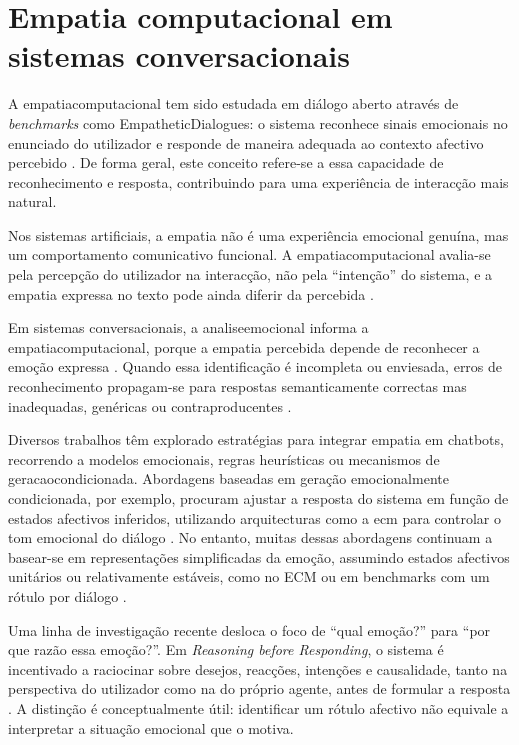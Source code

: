 \section{Empatia computacional em sistemas conversacionais}
\label{sec:empatia}

A \gls{empatiacomputacional} tem sido estudada em diálogo aberto através de \textit{benchmarks} como EmpatheticDialogues: o sistema reconhece sinais emocionais no enunciado do utilizador e responde de maneira adequada ao contexto afectivo percebido \parencite{Rashkin2019Empathy}. De forma geral, este conceito refere-se a essa capacidade de reconhecimento e resposta, contribuindo para uma experiência de interacção mais natural.

Nos sistemas artificiais, a empatia não é uma experiência emocional genuína, mas um comportamento comunicativo funcional. A \gls{empatiacomputacional} avalia-se pela percepção do utilizador na interacção, não pela ``intenção'' do sistema, e a empatia expressa no texto pode ainda diferir da percebida \parencite{Sharma2020Empathy}.

Em sistemas conversacionais, a \gls{analiseemocional} informa a \gls{empatiacomputacional}, porque a empatia percebida depende de reconhecer a emoção expressa \parencite{Rashkin2019Empathy}. Quando essa identificação é incompleta ou enviesada, erros de reconhecimento propagam-se para respostas semanticamente correctas mas inadequadas, genéricas ou contraproducentes \parencite{Huangfu2025NEC}.

Diversos trabalhos têm explorado estratégias para integrar empatia em chatbots, recorrendo a modelos emocionais, regras heurísticas ou mecanismos de \gls{geracaocondicionada}. Abordagens baseadas em geração emocionalmente condicionada, por exemplo, procuram ajustar a resposta do sistema em função de estados afectivos inferidos, utilizando arquitecturas como a \gls{ecm} para controlar o tom emocional do diálogo \parencite{Zhou2018ECM}. No entanto, muitas dessas abordagens continuam a basear-se em representações simplificadas da emoção, assumindo estados afectivos unitários ou relativamente estáveis, como no ECM ou em benchmarks com um rótulo por diálogo \parencite{Zhou2018ECM, Rashkin2019Empathy, PlazaDelArco2024Trends, Singh2026MultiEmotionIntensity}.

Uma linha de investigação recente desloca o foco de ``qual emoção?'' para ``por que razão essa emoção?''. Em \textit{Reasoning before Responding}, o sistema é incentivado a raciocinar sobre desejos, reacções, intenções e causalidade, tanto na perspectiva do utilizador como na do próprio agente, antes de formular a resposta \parencite{Fu2023ReasoningBeforeResponding}. A distinção é conceptualmente útil: identificar um rótulo afectivo não equivale a interpretar a situação emocional que o motiva.

